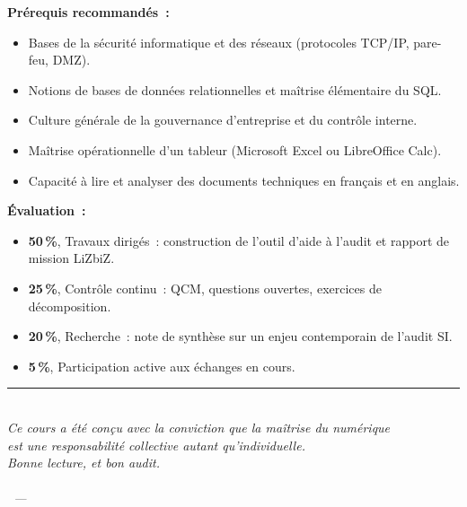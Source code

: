 \begin{boxinfo}
\textbf{Prérequis recommandés~:}
\begin{itemize}
    \item Bases de la sécurité informatique et des réseaux (protocoles TCP/IP, pare-feu, DMZ).
    \item Notions de bases de données relationnelles et maîtrise élémentaire du SQL.
    \item Culture générale de la gouvernance d'entreprise et du contrôle interne.
    \item Maîtrise opérationnelle d'un tableur (Microsoft Excel ou LibreOffice Calc).
    \item Capacité à lire et analyser des documents techniques en français et en anglais.
\end{itemize}
\end{boxinfo}

\begin{boxinfo}
\textbf{Évaluation~:}
\begin{itemize}
    \item \textbf{50\,\%}, Travaux dirigés~: construction de l'outil d'aide à l'audit et rapport de mission LiZbiZ.
    \item \textbf{25\,\%}, Contrôle continu~: QCM, questions ouvertes, exercices de décomposition.
    \item \textbf{20\,\%}, Recherche~: note de synthèse sur un enjeu contemporain de l'audit SI.
    \item \textbf{5\,\%}, Participation active aux échanges en cours.
\end{itemize}
\end{boxinfo}

\vspace{2ex}
\begin{center}
    {\color{CouleurAccent}\rule{0.6\linewidth}{1pt}}\\[0.8ex]
    {\small\itshape\color{CouleurPrimaire}
        Ce cours a été conçu avec la conviction que la maîtrise du numérique\\
        est une responsabilité collective autant qu'individuelle.\\
        Bonne lecture, et bon audit.}\\[0.5ex]
    {\small\bfseries\color{CouleurPrimaire}\auteurcours}\\
    {\small\color{CouleurBordInfo}\itshape\institutionprimaire\ —\ \anneescolaire}
\end{center}
